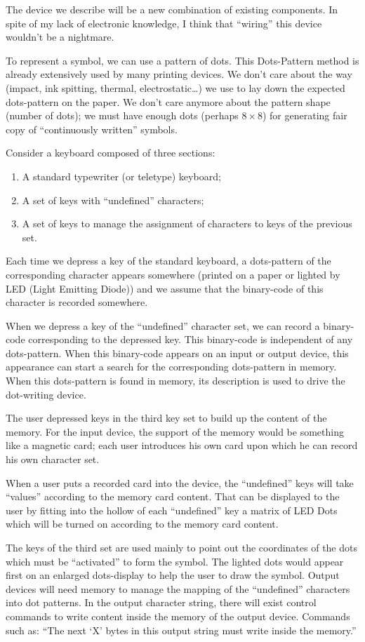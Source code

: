 \documentclass[openany,nobib]{tufte-book}
\begin{document}
The device we describe will be a new combination of existing components. In
spite of my lack of electronic knowledge, I think that ``wiring'' this device
wouldn't be a nightmare.

To represent a symbol, we can use a pattern of dots. This Dots-Pattern method
is already extensively used by many printing devices. We don't care about the
way (impact, ink spitting, thermal, electrostatic\dots) we use to lay down the
expected dots-pattern on the paper. We don't care anymore about the pattern
shape (number of dots); we must have enough dots (perhaps $8\times8$) for
generating fair copy of ``continuously written'' symbols.

Consider a keyboard composed of three sections:
\begin{enumerate}
    \item A standard typewriter (or teletype) keyboard;
    \item A set of keys with ``undefined'' characters;
    \item A set of keys to manage the assignment of characters to keys of the
previous set.
\end{enumerate}
Each time we depress a key of the standard keyboard, a dots-pattern of the
corresponding character appears somewhere (printed on a paper or lighted by LED
(Light Emitting Diode)) and we assume that the binary-code of this character is
recorded somewhere.

When we depress a key of the ``undefined'' character set, we can record a
binary-code corresponding to the depressed key. This binary-code is independent
of any dots-pattern. When this binary-code appears on an input or output
device, this appearance can start a search for the corresponding dots-pattern
in memory. When this dots-pattern is found in memory, its description is used
to drive the dot-writing device.

The user depressed keys in the third key set to build up the content of the
memory. For the input device, the support of the memory would be something like
a magnetic card; each user introduces his own card upon which he can record his
own character set.

When a user puts a recorded card into the device, the ``undefined'' keys will
take ``values'' according to the memory card content. That can be displayed to
the user by fitting into the hollow of each ``undefined'' key a matrix of LED
Dots which will be turned on according to the memory card content.

The keys of the third set are used mainly to point out the coordinates of the
dots which must be ``activated'' to form the symbol. The lighted dots would
appear first on an enlarged dots-display to help the user to draw the symbol.
Output devices will need memory to manage the mapping of the ``undefined''
characters into dot patterns. In the output character string, there will exist
control commands to write content inside the memory of the output device.
Commands such as: ``The next `X' bytes in this output string must write inside
the memory.''
\end{document}
